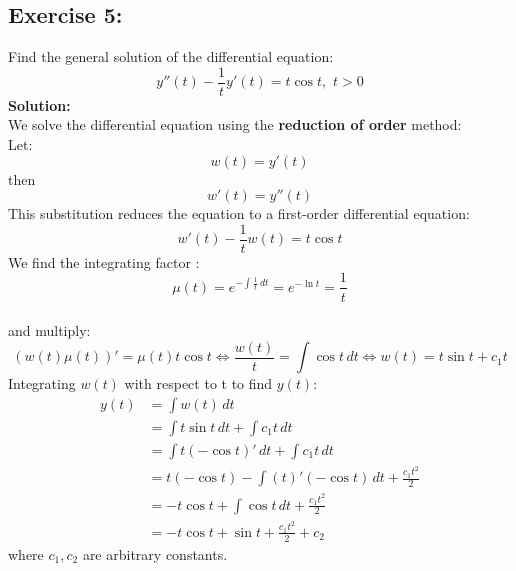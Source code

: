 \documentclass{article}
\begin{document}
 \subsection{Exercise 5:} 
 Find the general solution of the differential equation:
 $$y''(t)-\frac{1}{t}y'(t) = t\cos t,\,\, t>0$$
 \textbf{Solution:} \\
 We solve the differential equation using the \textbf{reduction of order} method: \\
 Let: 
 $$w(t) = y'(t)$$ 
 then 
 $$w'(t) = y''(t)$$ 
 This substitution reduces the equation to a first-order differential equation:
 $$w'(t)-\frac{1}{t}w(t) = t\cos t$$
 We find the integrating factor :
 $$μ(t) =  e^{-\int\frac{1}{t}\,dt} = e^{-\ln t} = \frac{1}{t} $$ \\
 and multiply:
 $$(w(t)μ(t))' = μ(t)t\cos t \iff \frac{w(t)}{t} = \int\cos t\,dt \iff w(t) = t\sin t+c_1t$$
 Integrating $w(t)$ with respect to t to find $y(t)$:
 \begin{align*}
      y(t) &= \int w(t) \,dt \\
      &= \int t\sin t \,dt + \int c_1t \,dt\\
      &= \int t(-\cos t)' \,dt + \int c_1t \,dt \\
      &= t(-\cos t)-\int(t)'(-\cos t) \,dt +\frac{c_1t^2}{2}\\
      &=-t\cos t+\int\cos t \,dt + \frac{c_1t^2}{2}\\
      &=-t\cos t+\sin t + \frac{c_1t^2}{2}+c_2 
 \end{align*}
 where $c_1,c_2$ are arbitrary constants.

\newpage
\end{document}

